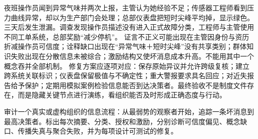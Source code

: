 夜班操作员闻到异常气味并两次上报，主管认为她经验不足；传感器工程师看到压力曲线异常，却以为生产部门会处理；总部仪表盘把短时尖峰平均掉，显示绿色。三天后发生泄漏。调查发现操作员描述没有进入正式故障分类，工程师与主管使用不同工单系统，总部奖励“减少停机”。 证言不正义可能出现在主管因身份与资历折减操作员可信度；诠释缺口出现在“异常气味＋短时尖峰”没有共享类别；群体知识失败出现在分散信息未被综合；激励结构又使坏消息成本升高。不能用其中一个概念吞并全部机制。 修复方案应逐项对应：保存原始异议并允许跨级复核；建立跨系统关联标识；仪表盘保留极值与不确定性；重大警报要求具名回应；对近失报告给予保护；定期用模拟案例检验信息能否到达决策者。最终验收不是制度文件存在，而是隐藏关键节点进行演练，看组织能否及时形成正确态度与行动。

\begin{tcolorbox}[breakable,colback=white,colframe=blue!30!black,title={专题研读任务},fonttitle=\bfseries]
审计一个真实或虚构组织的信息流程：从最弱势的观察者开始，追踪一条坏消息到最高决策者。标出每次摘要、分类、授权和激励，分别诊断可信度偏见、概念缺口、传播失真与聚合失败，并为每项设计可测试的修复。
\end{tcolorbox}


